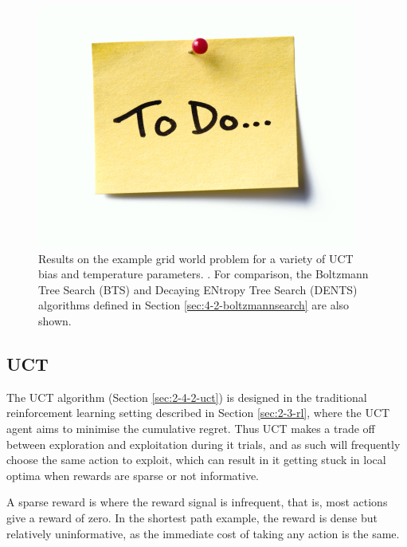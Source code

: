     \begin{figure}
        \centering
        \includegraphics[width=\textwidth]{figures/todo.jpg}
        \caption[Results on the example grid world problem for a variety of UCT bias and temperature parameters.]{Results on the example grid world problem for a variety of UCT bias and temperature parameters. . For comparison, the Boltzmann Tree Search (BTS) and Decaying ENtropy Tree Search (DENTS) algorithms defined in Section \ref{sec:4-2-boltzmannsearch} are also shown.}
        \label{fig:4:shortest_path_intro_results}
    \end{figure}


    \subsection{UCT}

        The UCT algorithm (Section \ref{sec:2-4-2-uct}) is designed in the traditional reinforcement learning setting described in Section \ref{sec:2-3-rl}, where the UCT agent aims to minimise the cumulative regret. Thus UCT makes a trade off between exploration and exploitation during it trials, and as such will frequently choose the same action to exploit, which can result in it getting stuck in local optima when rewards are sparse or not informative. 

        A sparse reward is where the reward signal is infrequent, that is, most actions give a reward of zero. In the shortest path example, the reward is dense but relatively uninformative, as the immediate cost of taking any action is the same. 

